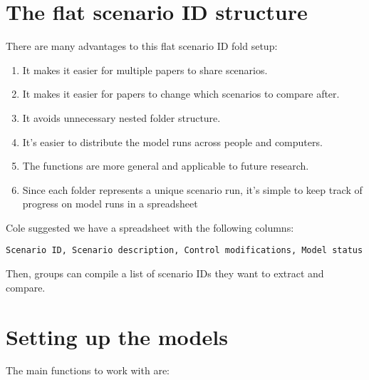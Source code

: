 \documentclass[12pt]{article}
\begin{document}
\section*{The flat scenario ID structure}
There are many advantages to this flat scenario ID fold setup:

\begin{enumerate}
  \item It makes it easier for multiple papers to share scenarios.

  \item It makes it easier for papers to change which scenarios to compare after.

  \item It avoids unnecessary nested folder structure.

  \item It's easier to distribute the model runs across people and computers.

  \item The functions are more general and applicable to future research.

  \item Since each folder represents a unique scenario run, it's simple to keep
    track of progress on model runs in a spreadsheet
  
\end{enumerate}

\noindent
Cole suggested we have a spreadsheet with the following columns:

\begin{verbatim}
Scenario ID, Scenario description, Control modifications, Model status
\end{verbatim}

\noindent
Then, groups can compile a list of scenario IDs they want to extract and compare.

\section*{Setting up the models}

The main functions to work with are:
\end{document}
